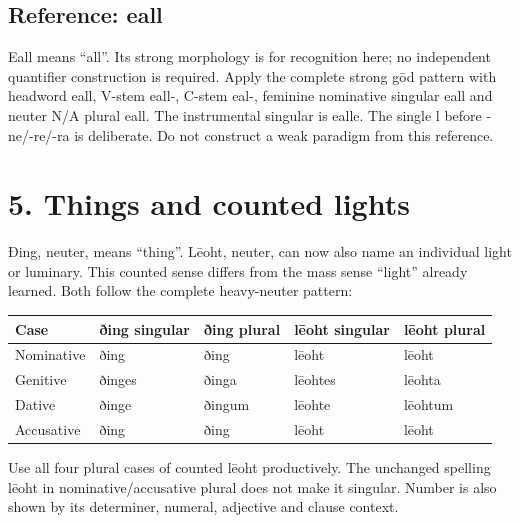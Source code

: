 \subsection*{Reference: eall}

Eall means “all”. Its strong morphology is for recognition here; no independent quantifier construction is required. Apply the complete strong gōd pattern with headword eall, V-stem eall-, C-stem eal-, feminine nominative singular eall and neuter N/\allowbreak{}A plural eall. The instrumental singular is ealle. The single l before -ne/\allowbreak{}-re/\allowbreak{}-ra is deliberate. Do not construct a weak paradigm from this reference.

\section*{5. Things and counted lights}

Ðing, neuter, means “thing”. Lēoht, neuter, can now also name an individual light or luminary. This counted sense differs from the mass sense “light” already learned. Both follow the complete heavy-neuter pattern:

\par\begingroup
\fontsize{10.5}{13.2}\selectfont
\setlength{\LTleft}{0pt}\setlength{\LTright}{\fill}
\noindent
\begin{tabular}{@{}>{\raggedright\arraybackslash}p{22.0mm}>{\raggedright\arraybackslash}p{22.688mm}>{\raggedright\arraybackslash}p{22.688mm}>{\raggedright\arraybackslash}p{22.688mm}>{\raggedright\arraybackslash}p{22.688mm}@{}}
\toprule
\textbf{Case} & \textbf{ðing singular} & \textbf{ðing plural} & \textbf{lēoht singular} & \textbf{lēoht plural} \\
\midrule
Nominative & ðing & ðing & lēoht & lēoht \\
Genitive & ðinges & ðinga & lēohtes & lēohta \\
Dative & ðinge & ðingum & lēohte & lēohtum \\
Accusative & ðing & ðing & lēoht & lēoht \\
\bottomrule
\end{tabular}
\par\endgroup
Use all four plural cases of counted lēoht productively. The unchanged spelling lēoht in nominative/\allowbreak{}accusative plural does not make it singular. Number is also shown by its determiner, numeral, adjective and clause context.

